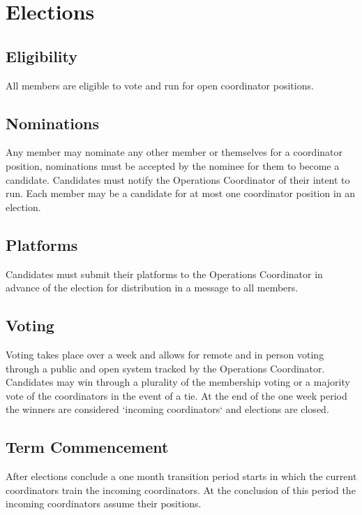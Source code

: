 \chapter{Elections}\label{sec:elections}

\section{Eligibility}\label{sec:eligibility}
All members are eligible to vote and run for open coordinator positions.

\section{Nominations}\label{sec:nominations}
Any member may nominate any other member or themselves for a coordinator position, nominations must be accepted by the nominee for them to become a candidate. Candidates must notify the Operations Coordinator of their intent to run. Each member may be a candidate for at most one coordinator position in an election.

\section{Platforms}\label{sec:platforms}
Candidates must submit their platforms to the Operations Coordinator in advance of the election for distribution in a message to all members.

\section{Voting}\label{sec:voting}
Voting takes place over a week and allows for remote and in person voting through a public and open system tracked by the Operations Coordinator. Candidates may win through a plurality of the membership voting or a majority vote of the coordinators in the event of a tie. At the end of the one week period the winners are considered `incoming coordinators` and elections are closed.

\section{Term Commencement}\label{sec:term_commencement}
After elections conclude a one month transition period starts in which the current coordinators train the incoming coordinators. At the conclusion of this period the incoming coordinators assume their positions.

